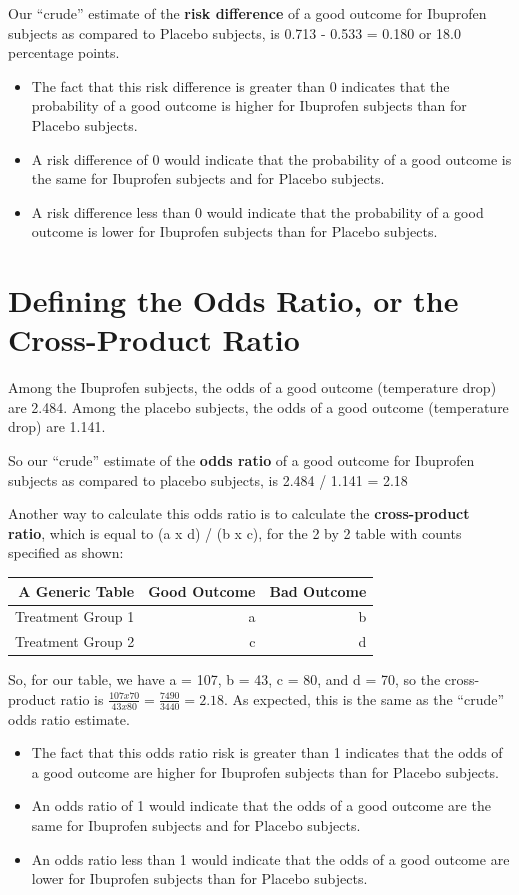 \documentclass[
]{book}
\providecommand{\tightlist}{%
  \setlength{\itemsep}{0pt}\setlength{\parskip}{0pt}}
\begin{document}
Our ``crude'' estimate of the \textbf{risk difference} of a good outcome for Ibuprofen subjects as compared to Placebo subjects, is 0.713 - 0.533 = 0.180 or 18.0 percentage points.

\begin{itemize}
\tightlist
\item
  The fact that this risk difference is greater than 0 indicates that the probability of a good outcome is higher for Ibuprofen subjects than for Placebo subjects.
\item
  A risk difference of 0 would indicate that the probability of a good outcome is the same for Ibuprofen subjects and for Placebo subjects.
\item
  A risk difference less than 0 would indicate that the probability of a good outcome is lower for Ibuprofen subjects than for Placebo subjects.
\end{itemize}

\hypertarget{defining-the-odds-ratio-or-the-cross-product-ratio}{%
\section{Defining the Odds Ratio, or the Cross-Product Ratio}\label{defining-the-odds-ratio-or-the-cross-product-ratio}}

Among the Ibuprofen subjects, the odds of a good outcome (temperature drop) are 2.484. Among the placebo subjects, the odds of a good outcome (temperature drop) are 1.141.

So our ``crude'' estimate of the \textbf{odds ratio} of a good outcome for Ibuprofen subjects as compared to placebo subjects, is 2.484 / 1.141 = 2.18

Another way to calculate this odds ratio is to calculate the \textbf{cross-product ratio}, which is equal to (a x d) / (b x c), for the 2 by 2 table with counts specified as shown:

\begin{longtable}[]{@{}rrr@{}}
\toprule
A Generic Table & Good Outcome & Bad Outcome\tabularnewline
\midrule
\endhead
Treatment Group 1 & a & b\tabularnewline
Treatment Group 2 & c & d\tabularnewline
\bottomrule
\end{longtable}

So, for our table, we have a = 107, b = 43, c = 80, and d = 70, so the cross-product ratio is \(\frac{107 x 70}{43 x 80} = \frac{7490}{3440} = 2.18\). As expected, this is the same as the ``crude'' odds ratio estimate.

\begin{itemize}
\tightlist
\item
  The fact that this odds ratio risk is greater than 1 indicates that the odds of a good outcome are higher for Ibuprofen subjects than for Placebo subjects.
\item
  An odds ratio of 1 would indicate that the odds of a good outcome are the same for Ibuprofen subjects and for Placebo subjects.
\item
  An odds ratio less than 1 would indicate that the odds of a good outcome are lower for Ibuprofen subjects than for Placebo subjects.
\end{itemize}
\end{document}
